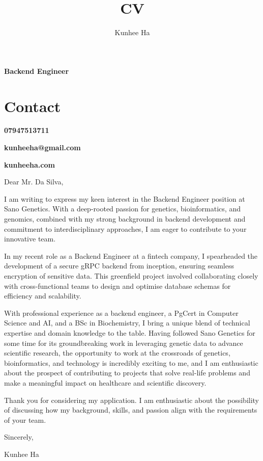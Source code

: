 \documentclass{article}
\renewcommand{\maketitle}{
  {\noindent\rmfamily\huge\bfseries\MakeUppercase\theauthor}

  {\color{black}\rmfamily\normalsize\bfseries{Backend Engineer}}
}
\newcommand{\contacts}[3]{
  {
    {\noindent\rmfamily\small\color{BodyGrey}\bfseries{\color{LightGrey}\faPhone}\hspace{3pt}#1}

    {\noindent\rmfamily\small\color{BodyGrey}\bfseries{\color{LightGrey}\faEnvelope}\hspace{3pt}#2}

    {\noindent\rmfamily\small\color{BodyGrey}\bfseries{\color{LightGrey}\faLink}\hspace{3pt}#3}

  }
}
\begin{document}
  \title{CV}
  \author{Kunhee Ha}
\begin{paracol}{2}
  \raggedright
  \maketitle

\section{Contact}

\contacts
  {07947513711}
  {kunheeha@gmail.com}
  {kunheeha.com}

  \switchcolumn
  \vspace{3pt}
\color{BodyGrey}
Dear Mr. Da Silva,
\vspace{15pt}

I am writing to express my keen interest in the Backend Engineer position at Sano Genetics. With a deep-rooted passion for genetics, bioinformatics, and genomics, combined with my strong background in backend development and commitment to interdisciplinary approaches, I am eager to contribute to your innovative team.
\vspace{15pt}


In my recent role as a Backend Engineer at a fintech company, I spearheaded the development of a secure gRPC backend from inception, ensuring seamless encryption of sensitive data. This greenfield project involved collaborating closely with cross-functional teams to design and optimise database schemas for efficiency and scalability.
\vspace{15pt}


With professional experience as a backend engineer, a PgCert in Computer Science and AI, and a BSc in Biochemistry, I bring a unique blend of technical expertise and domain knowledge to the table. Having followed Sano Genetics for some time for its groundbreaking work in leveraging genetic data to advance scientific research, the opportunity to work at the crossroads of genetics, bioinformatics, and technology is incredibly exciting to me, and I am enthusiastic about the prospect of contributing to projects that solve real-life problems and make a meaningful impact on healthcare and scientific discovery.
\vspace{15pt}


Thank you for considering my application. I am enthusiastic about the possibility of discussing how my background, skills, and passion align with the requirements of your team.
\vspace{15pt}


Sincerely,

Kunhee Ha
\end{paracol}
\end{document}
